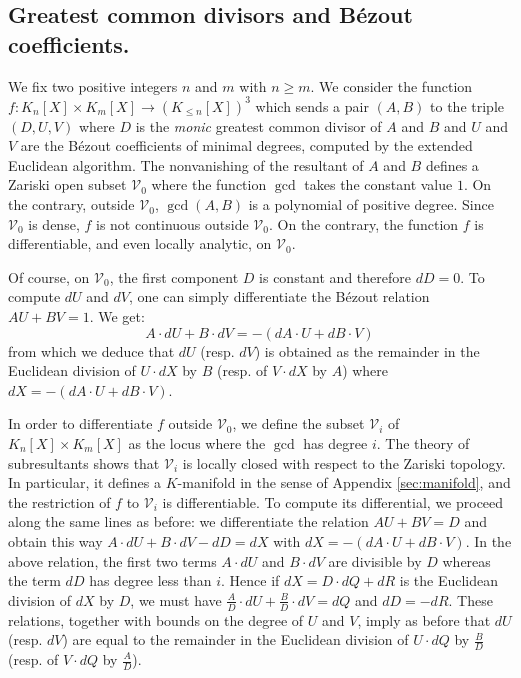 \documentclass{sig-alternate}
\begin{document}
{\subsection*{Greatest common divisors and B\'ezout coefficients.}

We fix two positive integers $n$ and $m$ with $n \geq m$. We consider the 
function $f : K_n[X] \times K_m[X] \to (K_{\leq n}[X])^3$ which sends a 
pair $(A,B)$ to the triple $(D, U, V)$ where $D$ is the \emph{monic} 
greatest common divisor of $A$ and $B$ and $U$ and $V$ are the B\'ezout 
coefficients of minimal degrees, computed by the extended 
Euclidean algorithm.
The nonvanishing of the resultant of $A$ and $B$ defines a Zariski open 
subset $\mathcal V_0$ where the function $\gcd$ takes the constant value 
$1$. On the contrary, outside $\mathcal V_0$, $\gcd(A,B)$ is a polynomial 
of positive degree.  Since $\mathcal V_0$ is dense, $f$ is not continuous outside 
$\mathcal V_0$. On the contrary, the function $f$ is differentiable, and even locally analytic,
on $\mathcal V_0$.

Of course, on $\mathcal V_0$, the first component $D$ is constant and 
therefore $dD = 0$. To compute $dU$ and $dV$, one can simply 
differentiate the B\'ezout relation $AU + BV = 1$. We get:
$$A \cdot dU + B \cdot dV = - (dA \cdot U + dB \cdot V)$$
from which we deduce that $dU$ (resp. $dV$) is obtained as the 
remainder in the Euclidean division of $U{\cdot}dX$ by $B$ (resp. of 
$V{\cdot}dX$ by $A$) where $dX = - (dA \cdot U + dB \cdot V)$.

In order to differentiate $f$ outside $\mathcal V_0$, we 
define the subset $\mathcal V_i$ of $K_n[X] \times 
K_m[X]$ as the locus where the $\gcd$ has degree $i$. The theory of 
subresultants shows that $\mathcal V_i$ is locally closed with respect to 
the Zariski topology. In particular, it defines a $K$-manifold in the 
sense of Appendix \ref{sec:manifold}, and the 
restriction of $f$ to $\mathcal V_i$ is differentiable. To compute
its differential, we proceed along the same lines as before: we 
differentiate the relation $AU + BV = D$ and obtain this way
$A \cdot dU + B \cdot dV - dD = dX$
with $dX = - (dA \cdot U + dB \cdot V)$. In the above relation, the
first two terms $A{\cdot}dU$ and $B{\cdot}dV$ are divisible by $D$ 
whereas the term $dD$ has degree less than $i$. 
Hence if $dX = D \cdot dQ + dR$ is the Euclidean division of $dX$ by $D$, 
we must have $\frac A D \cdot dU + \frac B D \cdot dV = dQ$ and $dD = 
-dR$. These relations, together with bounds on the degree of $U$ and $V$,
imply as before that $dU$ (resp. $dV$) are equal to the remainder in the
Euclidean division of $U{\cdot}dQ$ by $\frac B D$ (resp. of $V{\cdot}dQ$
by $\frac A D$).

}
\end{document}
